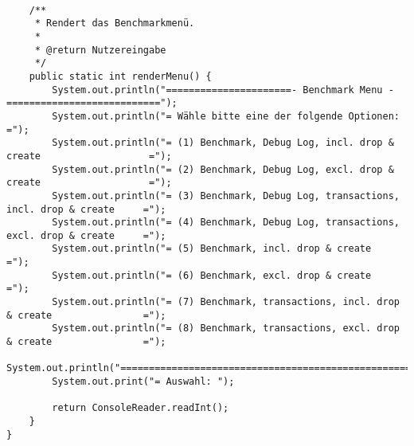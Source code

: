 \begin{lstlisting}[caption={Main (optimiert)}, label={lst:mainv2}]
	
	/**
	 * Rendert das Benchmarkmenü.
	 * 
	 * @return Nutzereingabe
	 */
	public static int renderMenu() {
		System.out.println("======================- Benchmark Menu -===========================");
		System.out.println("= Wähle bitte eine der folgende Optionen:                         =");
		System.out.println("= (1) Benchmark, Debug Log, incl. drop & create                   =");
		System.out.println("= (2) Benchmark, Debug Log, excl. drop & create                   =");
		System.out.println("= (3) Benchmark, Debug Log, transactions, incl. drop & create     =");
		System.out.println("= (4) Benchmark, Debug Log, transactions, excl. drop & create     =");
		System.out.println("= (5) Benchmark, incl. drop & create                              =");
		System.out.println("= (6) Benchmark, excl. drop & create                              =");
		System.out.println("= (7) Benchmark, transactions, incl. drop & create                =");
		System.out.println("= (8) Benchmark, transactions, excl. drop & create                =");
		System.out.println("===================================================================");
		System.out.print("= Auswahl: ");
		
		return ConsoleReader.readInt();
	}
}
\end{lstlisting}


